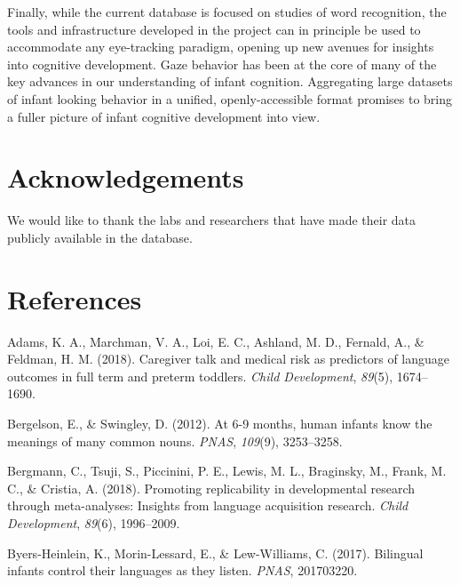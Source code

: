 \documentclass[10pt, letterpaper]{article}
\begin{document}
Finally, while the current database is focused on studies of word
recognition, the tools and infrastructure developed in the project can
in principle be used to accommodate any eye-tracking paradigm, opening
up new avenues for insights into cognitive development. Gaze behavior
has been at the core of many of the key advances in our understanding of
infant cognition. Aggregating large datasets of infant looking behavior
in a unified, openly-accessible format promises to bring a fuller
picture of infant cognitive development into view.

\hypertarget{acknowledgements}{%
\section{Acknowledgements}\label{acknowledgements}}

We would like to thank the labs and researchers that have made their
data publicly available in the database.

\hypertarget{references}{%
\section{References}\label{references}}

\setlength{\parindent}{-0.1in} 
\setlength{\leftskip}{0.125in}

\noindent

\hypertarget{refs}{}
\leavevmode\hypertarget{ref-Adams2018}{}%
Adams, K. A., Marchman, V. A., Loi, E. C., Ashland, M. D., Fernald, A.,
\& Feldman, H. M. (2018). Caregiver talk and medical risk as predictors
of language outcomes in full term and preterm toddlers. \emph{Child
Development}, \emph{89}(5), 1674--1690.

\leavevmode\hypertarget{ref-Bergelson2012a}{}%
Bergelson, E., \& Swingley, D. (2012). At 6-9 months, human infants know
the meanings of many common nouns. \emph{PNAS}, \emph{109}(9),
3253--3258.

\leavevmode\hypertarget{ref-Bergmann2018}{}%
Bergmann, C., Tsuji, S., Piccinini, P. E., Lewis, M. L., Braginsky, M.,
Frank, M. C., \& Cristia, A. (2018). Promoting replicability in
developmental research through meta-analyses: Insights from language
acquisition research. \emph{Child Development}, \emph{89}(6),
1996--2009.

\leavevmode\hypertarget{ref-Byers-Heinlein2017}{}%
Byers-Heinlein, K., Morin-Lessard, E., \& Lew-Williams, C. (2017).
Bilingual infants control their languages as they listen. \emph{PNAS},
201703220.
\end{document}
